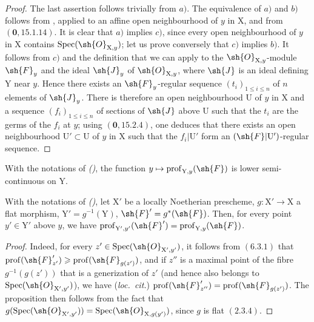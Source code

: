 \begin{proof}
The last assertion follows trivially from $a)$. The equivalence of $a)$ and $b)$ follows from , applied to an affine open neighbourhood of $y$ in $\mathrm{X}$, and from $(\mathbf{0},15.1.14)$. It is clear that $a)$ implies $c)$, since every open neighbourhood of $y$ in $\mathrm{X}$ contains $\operatorname{Spec}(\sh{O}_{\mathrm{X},y})$; let us prove conversely that $c)$ implies $b)$. It follows from $c)$ and the definition  that
we can apply  to the $\sh{O}_{\mathrm{X},y}$-module $\sh{F}_y$ and the ideal $\sh{J}_y$ of $\sh{O}_{\mathrm{X},y}$, where $\sh{J}$ is an ideal defining $\mathrm{Y}$ near $y$. Hence there exists an $\sh{F}_y$-regular sequence $(t_i)_{1\leqslant i\leqslant n}$ of $n$ elements of $\sh{J}_y$. There is therefore an open neighbourhood $\mathrm{U}$ of $y$ in $\mathrm{X}$ and a sequence $(f_i)_{1\leqslant i\leqslant n}$ of sections of $\sh{J}$ above $\mathrm{U}$ such that the $t_i$ are the germs of the $f_i$ at $y$; using $(\mathbf{0},15.2.4)$, one deduces that there exists an open neighbourhood $\mathrm{U}'\subset\mathrm{U}$ of $y$ in $\mathrm{X}$ such that the $f_i|\mathrm{U}'$ form an $(\sh{F}|\mathrm{U}')$-regular sequence.
\end{proof}

\begin{corollary}[19.9.4]
\label{IV.19.9.4}
With the notations of \emph{()}, the function $y\mapsto\operatorname{prof}_{\mathrm{Y},y}(\sh{F})$ is lower semi-continuous on $\mathrm{Y}$.
\end{corollary}

\begin{proposition}[19.9.5]
\label{IV.19.9.5}
With the notations of \emph{()}, let $\mathrm{X}'$ be a locally Noetherian prescheme, $g:\mathrm{X}'\to\mathrm{X}$ a flat morphism, $\mathrm{Y}'=g^{-1}(\mathrm{Y})$, $\sh{F}'=g^*(\sh{F})$. Then, for every point $y'\in\mathrm{Y}'$ above $y$, we have $\operatorname{prof}_{\mathrm{Y}',y'}(\sh{F}')=\operatorname{prof}_{\mathrm{Y},y}(\sh{F})$.
\end{proposition}

\begin{proof}
Indeed, for every $z'\in\operatorname{Spec}(\sh{O}_{\mathrm{X}',y'})$, it follows from $(6.3.1)$ that $\operatorname{prof}(\sh{F}'_{z'})\geqslant\operatorname{prof}(\sh{F}_{g(z')})$, and if $z''$ is a maximal point of the fibre $g^{-1}(g(z'))$ that is a generization of $z'$ (and hence also belongs to $\operatorname{Spec}(\sh{O}_{\mathrm{X}',y'})$), we have (\emph{loc.~cit.}) $\operatorname{prof}(\sh{F}'_{z''})=\operatorname{prof}(\sh{F}_{g(z')})$. The proposition then follows from the fact that $g(\operatorname{Spec}(\sh{O}_{\mathrm{X}',y'}))=\operatorname{Spec}(\sh{O}_{\mathrm{X},g(y')})$, since $g$ is flat $(2.3.4)$.
\end{proof}

